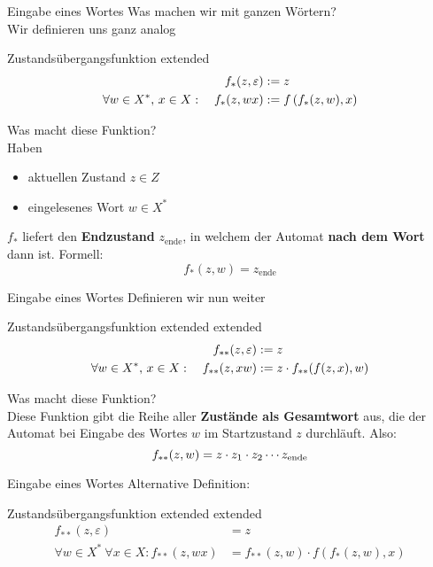 \begin{frame}{Eingabe eines Wortes}
	Was machen wir mit ganzen Wörtern? \\ \pause
	Wir definieren uns ganz analog
	\begin{block}{Zustandsübergangsfunktion extended}
	\begin{align*}
		 	f_*(z,\varepsilon) &:= z \\
		 	\forall w\in X^* , \, x\in X : \quad  f_*(z,wx) &:= f\left(f_*(z,w),x\right) 
	\end{align*}
	\end{block}
	\pause Was macht diese Funktion? \\ \pause
	\medskip
	Haben
	\begin{itemize}
		\item aktuellen Zustand $z \in Z$
		\item eingelesenes Wort $w \in X^*$
	\end{itemize}
	\impl $f_*$ liefert den \textbf{Endzustand} $z_\text{ende}$, in welchem der Automat \textbf{nach dem Wort} dann ist.
	Formell: $$ f_*(z,w) = z_\text{ende} $$
\end{frame}
	
\begin{frame}{Eingabe eines Wortes}
	Definieren wir nun weiter 
	\begin{block}{Zustandsübergangsfunktion extended extended}
		\begin{align*}
			f_{**}(z, \varepsilon) &:= z \\
			\forall w\in X^* , \, x\in X : \quad  f_{**}(z, xw)   &:= z \cdot f_{**}\!\left(f(z,x),w\right) \\
		\end{align*}
	\end{block}
	\pause Was macht diese Funktion? \\ \pause
	Diese Funktion gibt die Reihe aller \textbf{Zustände als Gesamtwort} aus, die der Automat bei Eingabe des Wortes $w$ im Startzustand $z$ durchläuft. Also: 
	$$ f_{**}(z, w) = z \cdot z_1 \cdot z_2 \cdots z_\text{ende} $$
\end{frame}

\begin{frame}{Eingabe eines Wortes}		
	Alternative Definition:
	\begin{block}{Zustandsübergangsfunktion extended extended}
		\begin{align*}
			f_{**}(z,\varepsilon) &= z \\
			\forall w \in X^* \ \forall x \in X : f_{**}(z,wx) &= f_{**}(z,w)\cdot f(f_*(z,w),x)	 
		\end{align*}
	\end{block}
\end{frame}

